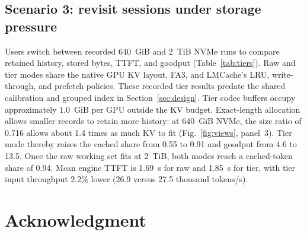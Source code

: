 \documentclass[conference]{IEEEtran}
\begin{document}
\subsection*{Scenario 3: revisit sessions under storage pressure}
Users switch between recorded 640~GiB and 2~TiB NVMe runs to compare
retained history, stored bytes, TTFT, and goodput (Table~\ref{tab:tiers}).
Raw and tier modes share
the native GPU KV layout, FA3, and LMCache's LRU, write-through, and
prefetch policies. These recorded tier results predate the shared
calibration and grouped index in Section~\ref{sec:design}.
Tier codec buffers occupy approximately 1.0~GiB per
GPU outside the KV budget. Exact-length allocation allows smaller
records to retain more history: at 640~GiB NVMe, the size ratio of 0.716
allows about 1.4 times as much KV to fit (Fig.~\ref{fig:views}, panel~3).
Tier mode thereby raises the cached share from 0.55 to 0.91 and goodput
from 4.6 to 13.5.
Once the raw working set fits at 2~TiB, both modes reach a cached-token
share of 0.94. Mean engine TTFT is 1.69~s for raw and 1.85~s for tier,
with tier input throughput 2.2\% lower (26.9 versus 27.5 thousand tokens/s).

\section*{Acknowledgment}
\par\vspace*{3\baselineskip}



\end{document}
